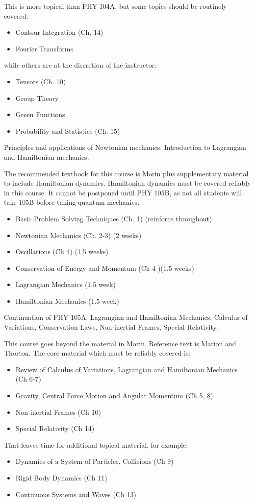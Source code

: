 \documentclass[12pt]{article}
\begin{document}
This is more topical than PHY 104A, but some topics should be routinely covered:
\begin{itemize}
 \item Contour Integration (Ch. 14)
 \item Fourier Transforms
\end{itemize}
while others are at the discretion of the instructor:
\begin{itemize}
 \item Tensors (Ch. 10)
 \item Group Theory
 \item Green Functions
 \item Probability and Statistics (Ch. 15)
\end{itemize}


\vskip 1cm
Principles and applications of Newtonian mechanics. Introduction to
Lagrangian and Hamiltonian mechanics.

The recommended textbook for this course is Morin plus supplementary
material to include Hamiltonian dynamics.  Hamiltonian dynamics must
be covered reliably in this course.  It cannot be postponed until PHY
105B, as not all students will take 105B before taking quantum mechanics.
\begin{itemize}
 \item Basic Problem Solving Techniques (Ch. 1) (reinforce throughout)
 \item Newtonian Mechanics (Ch. 2-3) (2 weeks)
 \item Oscillations (Ch 4) (1.5 weeks)
 \item Conservation of Energy and Momentum (Ch 4 )(1.5 weeks)
 \item Lagrangian Mechanics (1.5 week)
 \item Hamiltonian Mechanics (1.5 week)
\end{itemize}
   
\vskip 1cm
Continuation of PHY 105A.  Lagrangian and Hamiltonian Mechanics,
Calculus of Variations, Conservation Laws, Non-inertial Frames,
Special Relativity.

This course goes beyond the material in Morin.  Reference text is
Marion and Thorton.  The core material which must be reliably covered
is:
\begin{itemize}
 \item Review of Calculus of Variations, Lagrangian and Hamiltonian Mechanics (Ch 6-7) 
 \item Gravity, Central Force Motion and Angular Momentum (Ch 5, 8)
 \item Non-inertial Frames (Ch 10) 
 \item Special Relativity (Ch 14)
\end{itemize}
That leaves time for additional topical material, for example:
\begin{itemize}
 \item Dynamics of a System of Particles, Collisions (Ch 9) 
 \item Rigid Body Dynamics (Ch 11)
 \item Continuous Systems and Waves (Ch 13)
\end{itemize}
\end{document}
